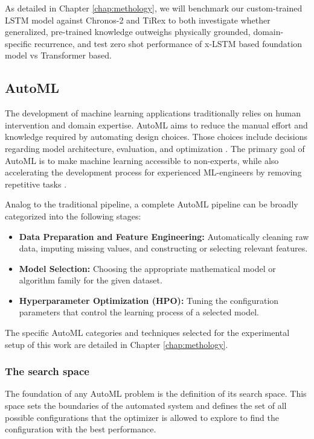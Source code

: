     
    As detailed in Chapter \ref{chap:methology}, we will benchmark our custom-trained \ac{LSTM} model against Chronos-2 and TiRex to both investigate whether generalized, pre-trained knowledge outweighs physically grounded, domain-specific recurrence, and test zero shot performance of \ac{x-LSTM} based foundation model vs Transformer based.
    

\subsection{AutoML}


The development of machine learning applications traditionally relies on human intervention and domain expertise. \ac{AutoML} aims to reduce the manual effort and knowledge required by automating design choices. Those choices include decisions regarding model architecture, evaluation, and optimization \parencite{hutter2019automated}. The primary goal of \ac{AutoML} is to make machine learning accessible to non-experts, while also accelerating the development process for experienced ML-engineers by removing repetitive tasks \parencite{AutoMLHoos, hutter2019automated}.

Analog to the traditional pipeline, a complete \ac{AutoML} pipeline can be broadly categorized into the following stages:
\begin{itemize}
    \item \textbf{Data Preparation and Feature Engineering:} Automatically cleaning raw data, imputing missing values, and constructing or selecting relevant features.
    \item \textbf{Model Selection:} Choosing the appropriate mathematical model or algorithm family for the given dataset.
    \item \textbf{Hyperparameter Optimization (HPO):} Tuning the configuration parameters that control the learning process of a selected model.
\end{itemize}
The specific \ac{AutoML} categories and techniques selected for the experimental setup of this work are detailed in Chapter \ref{chap:methology}.

\subsubsection{The search space}
The foundation of any \ac{AutoML} problem is the definition of its search space. This space sets the boundaries of the automated system and defines the set of all possible configurations that the optimizer is allowed to explore to find the configuration with the best performance.

